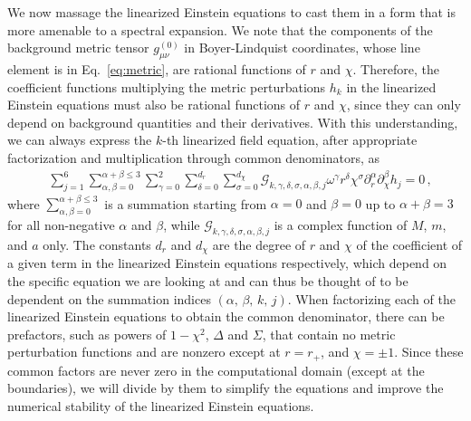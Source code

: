\documentclass[aps,prx,amsmath,floats,floatfix,twocolumn,
  superscriptaddress,nofootinbib,showpacs]{revtex4-1}
\begin{document}
We now massage the linearized Einstein equations to cast them in a form that is more amenable to a spectral expansion. 
We note that the components of the background metric tensor $g_{\mu\nu}^{(0)}$ in Boyer-Lindquist coordinates, whose line element is in Eq.~\eqref{eq:metric}, are rational functions of $r$ and $\chi$. 
Therefore, the coefficient functions multiplying the metric perturbations $h_k$ in the linearized Einstein equations must also be rational functions of $r$ and $\chi$, since they can only depend on background quantities and their derivatives. 
With this understanding, we can always express the $k$-th linearized field equation,
after appropriate factorization and multiplication through common denominators, as
%
\begin{equation}\label{eq:pertFE-1}
\begin{split}
& \sum_{j=1}^{6} \sum_{\alpha, \beta = 0}^{\alpha + \beta \leq 3} \sum_{\gamma=0}^{2} \sum_{\delta=0}^{d_{r}} \sum_{\sigma=0}^{d_{\chi}} \mathcal{G}_{k, \gamma, \delta, \sigma, \alpha, \beta, j} \omega^\gamma r^{\delta} \chi^{\sigma} \partial_{r}^{\alpha} \partial_{\chi}^{\beta} h_j = 0 \,,
\end{split}
\end{equation}
%
where $\sum_{\alpha, \beta = 0}^{\alpha + \beta \leq 3}$ is a summation starting from $\alpha=0$ and $\beta=0$ up to $\alpha+\beta=3$ for all non-negative $\alpha$ and $\beta$, while $\mathcal{G}_{k, \gamma, \delta, \sigma, \alpha, \beta, j}$ is a complex function of $M$, $m$, and $a$ only.
%
The constants $d_r$ and $d_\chi$ are the degree of $r$ and $\chi$ of the coefficient of a given term in the linearized Einstein equations respectively, which depend on the specific equation we are looking at and can thus be thought of to be dependent on the summation indices $(\alpha,\, \beta, \, k, \, j)$. 
When factorizing each of the linearized Einstein equations to obtain the common denominator, there can be prefactors, such as  powers of $1-\chi^2$, $\Delta$ and $\Sigma$, that contain no metric perturbation functions and are nonzero except at $r = r_+$, and $\chi = \pm 1$. 
Since these common factors are never zero in the computational domain (except at the boundaries), we will divide by them to simplify the equations and improve the numerical stability of the linearized Einstein equations.
\end{document}
